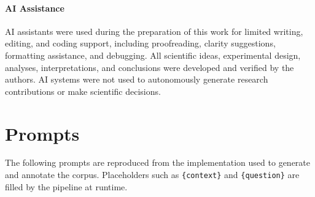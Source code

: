 \documentclass{article}
\theoremstyle{plain}
\theoremstyle{definition}
\theoremstyle{remark}
\begin{document}
\paragraph{AI Assistance}
AI assistants were used during the preparation of this work for limited writing, editing, and coding support, including proofreading, clarity suggestions, formatting assistance, and debugging. All scientific ideas, experimental design, analyses, interpretations, and conclusions were developed and verified by the authors. AI systems were not used to autonomously generate research contributions or make scientific decisions.



\clearpage
\onecolumn

\section{Prompts}
\label{appendix:prompts}

The following prompts are reproduced from the implementation used to generate and annotate the corpus.  Placeholders such as \texttt{\{context\}} and \texttt{\{question\}} are filled by the pipeline at runtime.
\end{document}
